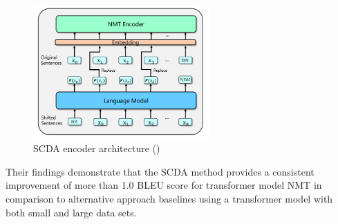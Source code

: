 \begin{figure}[ht!]
\centering
\includegraphics[width=0.6\textwidth]{media/literature/data_argumentation/da_scda.png}
\caption[Diagram of the \acrlong{SCDA} encoder architecture]{\acrlong{SCDA} encoder architecture (\cite{zhu_soft_2019})}
\label{fig:scda}
\end{figure}

Their findings demonstrate that the \acrshort{SCDA} method provides a consistent improvement of more than 1.0 BLEU score for transformer model \acrshort{NMT} in comparison to alternative approach baselines using a transformer model with both small and large data sets.







